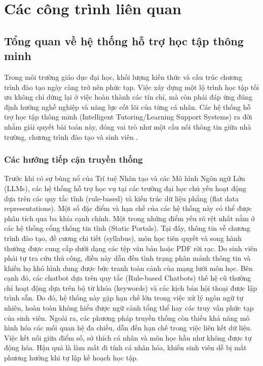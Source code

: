 \chapter{Các công trình liên quan}
\label{Chapter2}

\section{Tổng quan về hệ thống hỗ trợ học tập thông minh}
Trong môi trường giáo dục đại học, khối lượng kiến thức và cấu trúc chương trình đào tạo ngày càng trở nên phức tạp. Việc xây dựng một lộ trình học tập tối ưu không chỉ dừng lại ở việc hoàn thành các tín chỉ, mà còn phải đáp ứng đúng định hướng nghề nghiệp và năng lực cốt lõi của từng cá nhân. Các hệ thống hỗ trợ học tập thông minh (Intelligent Tutoring/Learning Support Systems) ra đời nhằm giải quyết bài toán này, đóng vai trò như một cầu nối thông tin giữa nhà trường, chương trình đào tạo và sinh viên \cite{zawacki2019systematic}.

\subsection{Các hướng tiếp cận truyền thống}
Trước khi có sự bùng nổ của Trí tuệ Nhân tạo và các Mô hình Ngôn ngữ Lớn (LLMs), các hệ thống hỗ trợ học vụ tại các trường đại học chủ yếu hoạt động dựa trên các quy tắc tĩnh (rule-based) và kiến trúc dữ liệu phẳng (flat data representations). Một số đặc điểm và hạn chế của các hệ thống này có thể được phân tích qua ba khía cạnh chính.
Một trong những điểm yếu rõ rệt nhất nằm ở các hệ thống cổng thông tin tĩnh (Static Portals). Tại đây, thông tin về chương trình đào tạo, đề cương chi tiết (syllabus), môn học tiên quyết và song hành thường được cung cấp dưới dạng các tệp văn bản hoặc PDF rời rạc. Do sinh viên phải tự tra cứu thủ công, điều này dẫn đến tình trạng phân mảnh thông tin và khiến họ khó hình dung được bức tranh toàn cảnh của mạng lưới môn học.
Bên cạnh đó, các chatbot dựa trên quy tắc (Rule-based Chatbots) thế hệ cũ thường chỉ hoạt động dựa trên bộ từ khóa (keywords) và các kịch bản hội thoại được lập trình sẵn. Do đó, hệ thống này gặp hạn chế lớn trong việc xử lý ngôn ngữ tự nhiên, hoàn toàn không hiểu được ngữ cảnh tổng thể hay các truy vấn phức tạp của sinh viên.
Ngoài ra, các phương pháp truyền thống còn thiếu khả năng mô hình hóa các mối quan hệ đa chiều, dẫn đến hạn chế trong việc liên kết dữ liệu. Việc kết nối giữa điểm số, sở thích cá nhân và môn học hầu như không được tự động hóa. Hậu quả là làm mất đi tính cá nhân hóa, khiến sinh viên dễ bị mất phương hướng khi tự lập kế hoạch học tập.

